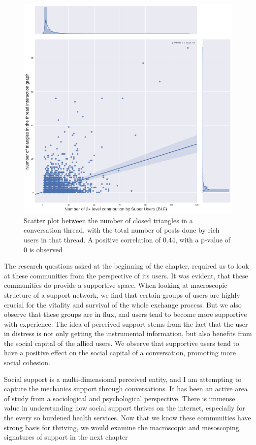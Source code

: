 \begin{figure}[!ht]
\centering
\includegraphics[width=0.7\linewidth ]{SUParticipationTriangles.png}

\caption{Scatter plot between the number of closed triangles in a conversation thread, with the total number of posts done by rich users in that thread. A positive correlation of 0.44, with a p-value of 0 is observed}
\label{fig:TriCorr}
\end{figure}



The research questions asked at the beginning of the chapter, required us to look at these communities from the perspective of its users. It was evident, that these communities do provide a supportive space. 
When looking at macroscopic structure of a support network, we find that certain groups of users are highly crucial for the vitality and survival of the whole exchange process. But we also observe that these groups are in flux, and users tend to become more supportive with experience. 
The idea of perceived support stems from the fact that the user in distress is not only getting the instrumental information, but also benefits from the social capital of the allied users. We observe that supportive users tend to have a positive effect on the social capital of a conversation, promoting more social cohesion.

Social support is a multi-dimensional perceived entity, and I am attempting to capture the mechanics support through conversations. It has been an active area of study from a sociological and psychological perspective. 
There is immense value in understanding how social support thrives on the internet, especially for the every so burdened health services. Now that we know these communities have strong basis for thriving, we would examine the macroscopic and mesoscoping signatures of support in the next chapter 

